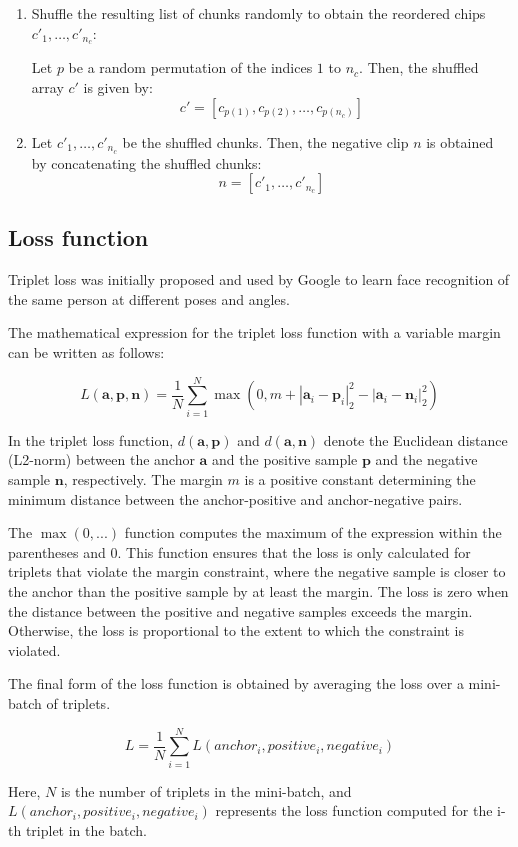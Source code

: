 \begin{enumerate}
\item Shuffle the resulting list of chunks randomly to obtain the reordered chips $c'_1,\ldots,c'_{n_c}$:

Let $p$ be a random permutation of the indices $1$ to $n_c$. Then, the shuffled array $c'$ is given by:
\begin{equation}
c' = [c_{p(1)}, c_{p(2)}, \dots, c_{p(n_c)}]
\end{equation}


\item Let $c'_1, \dots, c'_{n_c}$ be the shuffled chunks. Then, the negative clip $n$ is obtained by concatenating the shuffled chunks:
\begin{equation}
n = [c'_1, \dots, c'_{n_c}]
\end{equation}


\end{enumerate}

\subsection{Loss function}

Triplet loss was initially proposed and used by Google to learn face recognition of the same person at different poses and angles. \cite{Schroff2015FaceNet:Clustering}

The mathematical expression for the triplet loss function with a variable margin can be written as follows:

\begin{equation}
L(\mathbf{a}, \mathbf{p}, \mathbf{n}) = \frac{1}{N} \sum_{i=1}^{N} \max \left(0, m + \left| \mathbf{a}_i - \mathbf{p}_i \right|_2^2 - \left| \mathbf{a}_i - \mathbf{n}_i \right|_2^2 \right)
\end{equation}

In the triplet loss function, $d(\mathbf{a}, \mathbf{p})$ and $d(\mathbf{a}, \mathbf{n})$ denote the Euclidean distance (L2-norm) between the anchor $\mathbf{a}$ and the positive sample $\mathbf{p}$ and the negative sample $\mathbf{n}$, respectively. The margin $m$ is a positive constant determining the minimum distance between the anchor-positive and anchor-negative pairs.

The $\max(0, ...)$ function computes the maximum of the expression within the parentheses and 0. This function ensures that the loss is only calculated for triplets that violate the margin constraint, where the negative sample is closer to the anchor than the positive sample by at least the margin. The loss is zero when the distance between the positive and negative samples exceeds the margin. Otherwise, the loss is proportional to the extent to which the constraint is violated.

The final form of the loss function is obtained by averaging the loss over a mini-batch of triplets. 

\begin{equation}
L = \frac{1}{N} \sum_{i=1}^{N} L(anchor_i, positive_i, negative_i)
\end{equation}

Here, $N$ is the number of triplets in the mini-batch, and $L(anchor_i, positive_i, negative_i)$ represents the loss function computed for the i-th triplet in the batch.